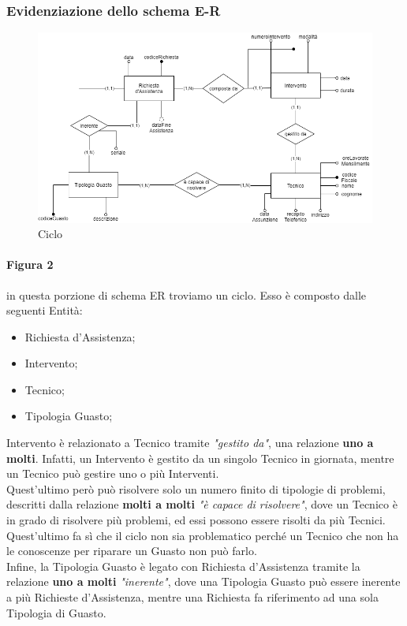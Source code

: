 \documentclass[legalpaper]{article}
\begin{document}
\subsubsection{Evidenziazione dello schema E-R}



\begin{figure}[!ht]
	\centering
	\begin{minipage}[b]{0.8\textwidth}
		\includegraphics[width=\linewidth]{image/ciclo.png}
			\caption{Ciclo}
		\label{fig:ciclo}

	\end{minipage}
\hfill

\end{figure}

\paragraph{Figura 2}
in questa porzione di schema ER troviamo un ciclo. Esso è composto dalle seguenti Entità: 
		\begin{itemize}
			\item Richiesta d'Assistenza;
			\item Intervento;
			\item Tecnico;
			\item Tipologia Guasto;
		\end{itemize}
		
		Intervento è relazionato a Tecnico tramite \textit{"gestito da"}, una relazione \textbf{uno a molti}. Infatti, un Intervento è gestito da un singolo Tecnico in giornata, mentre un Tecnico può gestire uno o più Interventi.\\	
		Quest'ultimo però può risolvere solo un numero finito di tipologie di problemi, descritti dalla relazione \textbf{molti a molti} \textit{"è capace di risolvere"}, dove un Tecnico è in grado di risolvere più problemi, ed essi possono essere risolti da più Tecnici.\\
		Quest'ultimo fa sì che il ciclo non sia problematico perché un Tecnico che non ha le conoscenze per riparare un Guasto non può farlo.\\
		Infine, la Tipologia Guasto è legato con Richiesta d'Assistenza tramite la relazione \textbf{uno a molti} \textit{"inerente"}, dove una Tipologia Guasto può essere inerente a più Richieste d'Assistenza, mentre una Richiesta fa riferimento ad una sola Tipologia di Guasto.\pagebreak
\end{document}
